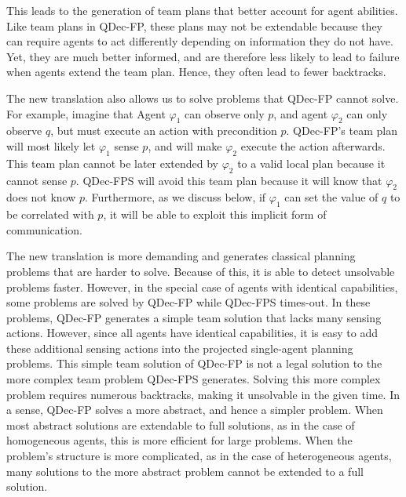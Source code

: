 \documentclass[letterpaper]{article} %
\theoremstyle{definition}
\begin{document}
This leads to the generation of team plans that better account for agent abilities. Like team plans in QDec-FP, these plans may not be extendable because they can require agents to act differently depending on information they do not have. Yet, they are much better informed, and are therefore less likely to lead to failure when agents extend the team plan. Hence, they often lead to fewer backtracks. %




The new translation also allows us to solve problems that QDec-FP cannot solve. For
example, imagine
that Agent $\varphi_1$ can observe only $p$, and agent $\varphi_2$ can only observe $q$, but must execute an action with
precondition $p$. QDec-FP's team plan will most likely let $\varphi_1$ sense $p$, and
will make $\varphi_2$ execute the action afterwards.
This team plan cannot be later extended by $\varphi_2$ to a valid local plan because it cannot sense $p$. QDec-FPS will avoid this team plan because it will know that $\varphi_2$ does not know $p$. Furthermore, as we discuss below, if $\varphi_1$ can set the value of $q$ to be correlated with $p$, it will be able to exploit this implicit form of communication.

The new translation is more demanding and generates classical planning problems that are harder to solve.
Because of this, it is able to detect unsolvable problems faster.
However, in the special case of agents with identical capabilities,
some problems are solved
by QDec-FP while QDec-FPS times-out.
In these problems,  QDec-FP generates a simple team solution that lacks many sensing actions. However, since all agents have identical capabilities, it is easy to add these additional sensing actions
into the projected single-agent planning problems. This simple team solution of QDec-FP is not a legal solution to
the more complex team problem QDec-FPS generates. Solving this more complex problem requires numerous backtracks,
making it unsolvable in the given time.
In a sense, QDec-FP solves a more abstract,
and hence a simpler problem. When most abstract solutions are extendable to full solutions, as in the case of homogeneous agents, this is more efficient for large problems. When the problem's structure is more complicated, as in the case of heterogeneous agents, many solutions to the more abstract problem cannot be extended to a full solution.
\end{document}
